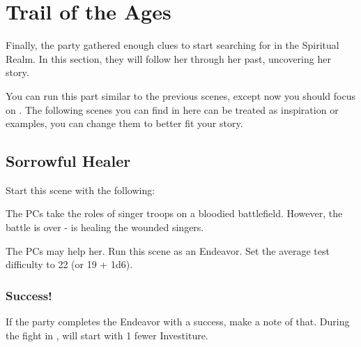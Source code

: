 \section{Trail of the Ages}
\label{sec:trailOfTheAges}

Finally, the party gathered enough clues to start searching for \npcMishram{} in the Spiritual Realm. In this section, they will follow her through her past, uncovering her story.

You can run this part similar to the previous scenes, except now you should focus on \npcMishram{}. The following scenes you can find in here can be treated as inspiration or examples, you can change them to better fit your story.



\subsection{Sorrowful Healer}

Start this scene with the following:


The PCs take the roles of singer troops on a bloodied battlefield. However, the battle is over - \npcMishram{} is healing the wounded singers. 

The PCs may help her. Run this scene as an Endeavor. Set the average test difficulty to 22 (or 19 + 1d6).


\subsubsection{Success!}

If the party completes the Endeavor with a success, make a note of that. During the fight in , \enemyMishram{} will start with 1 fewer Investiture.

